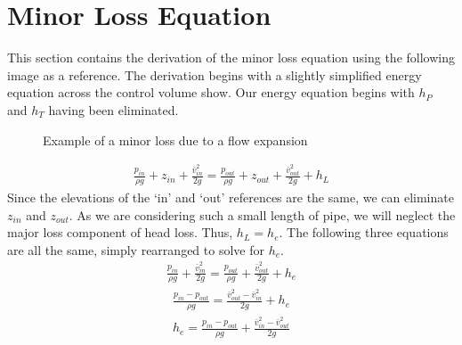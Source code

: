 \documentclass[letterpaper,10pt,english]{sphinxmanual}
\let\sphinxpxdimen\pdfpxdimen\else\newdimen\sphinxpxdimen
\begin{document}
\section{Minor Loss Equation}
\label{\detokenize{Fluids_Review/Fluids_Review_Derivations:minor-loss-equation}}\label{\detokenize{Fluids_Review/Fluids_Review_Derivations:minor-loss-equation-derivation}}
This section contains the derivation of the minor loss equation using the following image as a reference. The derivation begins with a slightly simplified energy equation across the control volume show. Our energy equation begins with \(h_P\) and \(h_T\) having been
eliminated.

\begin{figure}[htbp]
\centering
\capstart

\noindent\sphinxincludegraphics[width=700\sphinxpxdimen]{{minor_loss_pipe}.png}
\caption{Example of a minor loss due to a flow expansion}\label{\detokenize{Fluids_Review/Fluids_Review_Derivations:id2}}\label{\detokenize{Fluids_Review/Fluids_Review_Derivations:minor-loss-pipe}}\end{figure}
\begin{equation}\label{equation:Fluids_Review/Fluids_Review_Derivations:Fluids_Review/Fluids_Review_Derivations:0}
\begin{split}\frac{p_{in}}{\rho g} + {z_{in}} + \frac{\bar v_{in}^2}{2g} = \frac{p_{out}}{\rho g} + z_{out} + \frac{\bar v_{out}^2}{2g} + h_L\end{split}
\end{equation}
Since the elevations of the ‘in’ and ‘out’ references are the same, we can eliminate \(z_{in}\) and \(z_{out}\). As we are considering such a small length of pipe, we will neglect the major loss component of head loss. Thus, \(h_L = h_e\). The following three equations are all the same, simply rearranged to solve for \(h_e\).
\begin{equation}\label{equation:Fluids_Review/Fluids_Review_Derivations:Fluids_Review/Fluids_Review_Derivations:1}
\begin{split}\frac{p_{in}}{\rho g} + \frac{\bar v_{in}^2}{2g} = \frac{p_{out}}{\rho g} + \frac{\bar v_{out}^2}{2g} + h_e\end{split}
\end{equation}\begin{equation}\label{equation:Fluids_Review/Fluids_Review_Derivations:Fluids_Review/Fluids_Review_Derivations:2}
\begin{split}\frac{p_{in} - p_{out}}{\rho g} = \frac{\bar v_{out}^2 - \bar v_{in}^2}{2g} + h_e\end{split}
\end{equation}\begin{equation}\label{equation:Fluids_Review/Fluids_Review_Derivations:Fluids_Review/Fluids_Review_Derivations:3}
\begin{split}h_e = \frac{p_{in} - p_{out}}{\rho g} + \frac{\bar v_{in}^2 - \bar v_{out}^2}{2g}\end{split}
\end{equation}
\end{document}
